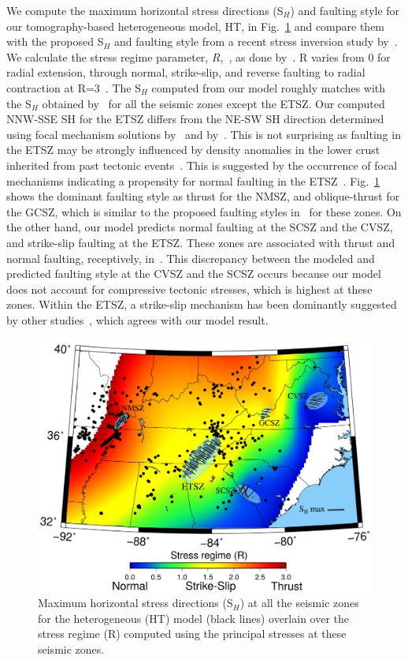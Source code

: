 \documentclass[draft,linenumbers]{agujournal2018}
\begin{document}
We compute the maximum horizontal stress directions (S$_H$) and faulting style for our tomography-based heterogeneous model, HT, in Fig.~\ref{sigma1} and compare them with the proposed S$_H$ and faulting style from a recent stress inversion study by~\citet{levandowski2018updated}. We calculate the  stress regime parameter, $R$,~\citep{delvaux1997paleostress}, as done by~\citet{levandowski2018updated}. R varies from 0 for radial extension, through normal, strike-slip, and reverse faulting to radial contraction at R=3~\citep{delvaux1997paleostress, simpson1997quantifying}. The S$_H$ computed from our model roughly matches with the S$_H$ obtained by~\citet{levandowski2018updated} for all the seismic zones except the ETSZ.  Our computed NNW-SSE SH for the ETSZ differs from the NE-SW SH direction determined using focal mechanism solutions by~\citet{levandowski2018updated} and by~\citep{mazzotti2010state}. This is not surprising as faulting in the ETSZ may be strongly influenced by density anomalies in the lower crust inherited from past tectonic events~\citet{levandowski2018updated}. This is suggested by the occurrence of focal mechanisms indicating a propensity for normal faulting in the ETSZ~\citep{cooley2015new}. Fig.~\ref{sigma1} shows the dominant faulting style as thrust for the NMSZ, and oblique-thrust for the GCSZ, which is similar to the proposed faulting styles in~\citet{levandowski2018updated} for these zones. On the other hand, our model predicts normal faulting at the SCSZ and the CVSZ, and strike-slip faulting at the ETSZ. These zones are associated with thrust and normal faulting, receptively, in~\citet{levandowski2018updated}. This discrepancy between the modeled and predicted faulting style at the CVSZ and the SCSZ occurs because our model does not account for compressive tectonic stresses, which is highest at these zones. Within the ETSZ, a strike-slip mechanism has been dominantly suggested by other studies~\citep{mazzotti2010state, powell2016grenville}, which agrees with our model result.

\begin{figure}[h!]
    \centering
    \includegraphics[width=0.75\linewidth]{figures/sigma1.png}
    \caption{Maximum horizontal stress directions (S$_H$) at all the seismic zones for the heterogeneous (HT) model (black lines) overlain over the stress regime (R) computed using the principal stresses at these seismic zones. }
    \label{sigma1}
\end{figure}
\end{document}
